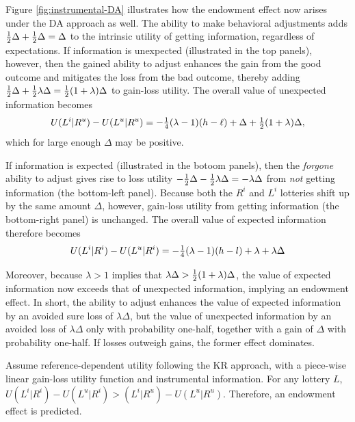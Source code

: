 Figure \ref{fig:instrumental-DA} illustrates how the endowment effect now arises under the DA approach as well. The ability to make behavioral adjustments adds $\tfrac{1}{2} \Delta + \tfrac{1}{2} \Delta = \Delta$ to the intrinsic utility of getting information, regardless of expectations. If information is unexpected (illustrated in the top panels), however, then the gained ability to adjust enhances the gain from the good outcome and mitigates the loss from the bad outcome, thereby adding $\tfrac{1}{2} \Delta + \tfrac{1}{2} \lambda \Delta = \tfrac{1}{2} (1 + \lambda) \Delta$ to gain-loss utility. The overall value of unexpected information becomes
\begin{equation*}
  U(L^i|R^u)-U(L^u|R^u)=-\tfrac{1}{4}(\lambda-1)(h-\ell)+\Delta +\tfrac{1}{2}(1+\lambda)\Delta,
\end{equation*}
which for large enough $\Delta$ may be positive.

If information is expected (illustrated in the botoom panels), then the \emph{forgone} ability to adjust gives rise to loss utility $-\tfrac{1}{2} \Delta - \tfrac{1}{2} \lambda \Delta = -\lambda \Delta$ from \emph{not} getting information (the bottom-left panel). Because both the $R^i$ and $L^i$ lotteries shift up by the same amount $\Delta$, however, gain-loss utility from getting information (the bottom-right panel) is unchanged. The overall value of expected information therefore becomes
\begin{equation*}
  U(L^i|R^i)-U(L^u|R^i)=-\tfrac{1}{4}(\lambda-1)(h-l)+\lambda +\lambda \Delta
\end{equation*}

Moreover, because $\lambda>1$ implies that $\lambda \Delta > \tfrac{1}{2}(1+\lambda)\Delta$, the value of expected information now exceeds that of unexpected information, implying an endowment effect. In short, the ability to adjust enhances the value of expected information by an avoided sure loss of $\lambda \Delta$, but the value of unexpected information by an avoided loss of $\lambda \Delta$ only with probability one-half, together with a gain of $\Delta$ with probability one-half. If losses outweigh gains, the former effect dominates.

\FloatBarrier

\begin{prop}
  Assume reference-dependent utility following the KR approach, with a piece-wise linear gain-loss utility function and instrumental information. For any lottery $L$, $U(L^i|R^i)-U(L^u|R^i)>(L^i|R^u)-U(L^u|R^u)$. Therefore, an endowment effect is predicted.
  \label{prop:instrumental-KR}
\end{prop}

